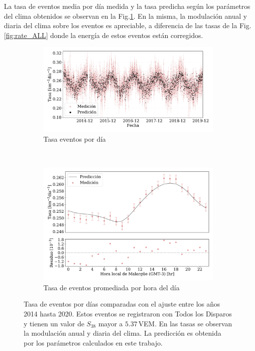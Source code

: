 La tasa de eventos media por día  medida y la tasa predicha según los parámetros del clima obtenidos se observan en la Fig.\ref{fig:rate_dayly_AllTriggers}. En la misma, la modulación anual y diaria del clima sobre los eventos es apreciable, a diferencia de las tasas de la Fig.\,\ref{fig:rate_ALL} donde  la energía de estos eventos están corregidos.  
\begin{figure}[H]
\centering
  \begin{subfigure}[b]{0.9\textwidth}
  \includegraphics[width=\textwidth]{Graphs/rate_dayly/AllTriggers_S38_over_1EeV_rate_v3.pdf}
  \caption{Tasa eventos por día}\label{fig:rate_dayly_AllTriggers}
  \end{subfigure}\\
  \begin{subfigure}[b]{0.9\textwidth}
  \includegraphics[width=\textwidth]{Graphs/rate_hour_of_the_day/AllTriggers_S38_over_1EeV_hour_of_the_day.pdf}
  \caption{Tasa de eventos promediada por hora del día }\label{fig:rate_hod_AllTriggers}
  \end{subfigure}
  \caption{Tasa de eventos por días comparadas con el ajuste entre los años 2014 hasta 2020. Estos eventos se registraron con Todos los Disparos  y tienen un valor de $S_{38}$ mayor a $5.37\,$VEM. En las tasas se observan la modulación anual y diaria del clima. La predicción es obtenida por los parámetros calculados en este trabajo.}\label{fig:rate__AllTriggers}
\end{figure}

